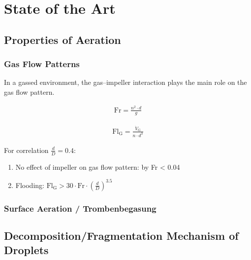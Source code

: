 \chapter{State of the Art} \label{ch:state_of_the_art}




\section{Properties of Aeration}

\subsection{Gas Flow Patterns}
In a gassed environment, the gas--impeller interaction plays the main role on the gas flow pattern.

\begin{gather}
    \text{Fr} = \frac{n^2 \cdot d}{g}
\end{gather}

\begin{gather}
    \text{Fl}_\text{G} = \frac{\Dot{V}_\text{G}}{n \cdot d^3}
\end{gather}

For correlation $\frac{d}{D} = 0.4$:

\begin{enumerate}
    \item No effect of impeller on gas flow pattern: by Fr < 0.04
    \item Flooding: $\text{Fl}_\text{G} > 30 \cdot \text{Fr} \cdot \left( \frac{d}{D} \right)^{3.5}$
\end{enumerate}

\subsection{Surface Aeration / Trombenbegasung}

\section{Decomposition/Fragmentation Mechanism of Droplets}
